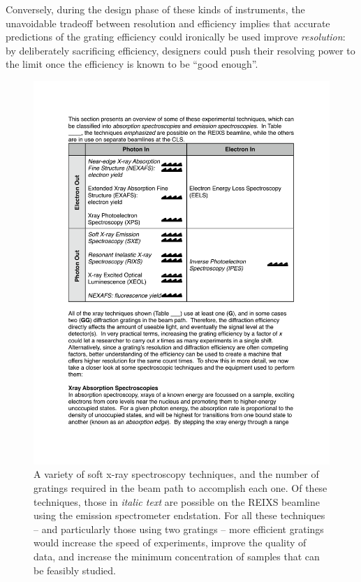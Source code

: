  Conversely, during the design phase of these kinds of instruments, the unavoidable tradeoff between resolution and efficiency implies that accurate predictions of the grating efficiency could ironically be used improve \emph{resolution}: by deliberately sacrificing efficiency, designers could push their resolving power to the limit once the efficiency is known to be ``good enough''.
 
 \begin{figure}[htbp] %
   \centering
   \includegraphics[scale=0.8]{../data/Chapter1/1h_techniques/1h.pdf} 
   \caption{A variety of soft x-ray spectroscopy techniques, and the number of gratings required in the beam path to accomplish each one.  Of these techniques, those in \emph{italic text} are possible on the REIXS beamline using the emission spectrometer endstation.  For all these techniques -- and particularly those using two gratings -- more efficient gratings would increase the speed of experiments, improve the quality of data, and increase the minimum concentration of samples that can be feasibly studied.}
   \label{1h}
\end{figure}
 